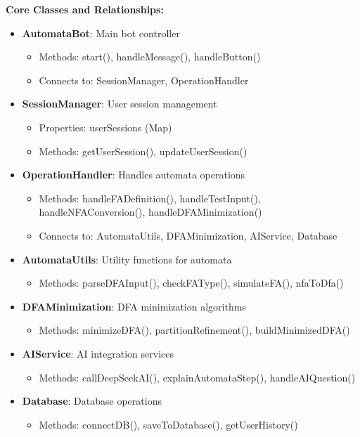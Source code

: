 \documentclass[12pt]{article}
\begin{document}
\textbf{Core Classes and Relationships:}
\begin{itemize}
    \item \textbf{AutomataBot}: Main bot controller
    \begin{itemize}
        \item Methods: start(), handleMessage(), handleButton()
        \item Connects to: SessionManager, OperationHandler
    \end{itemize}
    \item \textbf{SessionManager}: User session management
    \begin{itemize}
        \item Properties: userSessions (Map)
        \item Methods: getUserSession(), updateUserSession()
    \end{itemize}
    \item \textbf{OperationHandler}: Handles automata operations
    \begin{itemize}
        \item Methods: handleFADefinition(), handleTestInput(), handleNFAConversion(), handleDFAMinimization()
        \item Connects to: AutomataUtils, DFAMinimization, AIService, Database
    \end{itemize}
    \item \textbf{AutomataUtils}: Utility functions for automata
    \begin{itemize}
        \item Methods: parseDFAInput(), checkFAType(), simulateFA(), nfaToDfa()
    \end{itemize}
    \item \textbf{DFAMinimization}: DFA minimization algorithms
    \begin{itemize}
        \item Methods: minimizeDFA(), partitionRefinement(), buildMinimizedDFA()
    \end{itemize}
    \item \textbf{AIService}: AI integration services
    \begin{itemize}
        \item Methods: callDeepSeekAI(), explainAutomataStep(), handleAIQuestion()
    \end{itemize}
    \item \textbf{Database}: Database operations
    \begin{itemize}
        \item Methods: connectDB(), saveToDatabase(), getUserHistory()
    \end{itemize}
\end{itemize}
\end{document}
